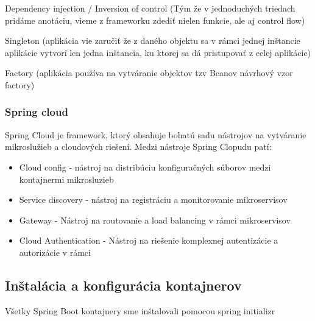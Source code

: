   

Dependency injection / Inversion of control (Tým že v jednoduchých triedach pridáme anotáciu, vieme z frameworku zdediť nielen funkcie, ale aj control flow)  

  

Singleton (aplikácia vie zaručiť že z daného objektu sa v rámci jednej inštancie aplikácie vytvorí len jedna inštancia, ku ktorej sa dá pristupovať z celej aplikácie) 

  

Factory (aplikácia používa na vytváranie objektov tzv Beanov návrhový vzor factory) 

  

  

  

\subsubsection{Spring cloud} 

 Spring Cloud je framework, ktorý obsahuje bohatú sadu nástrojov na vytváranie mikroslužieb a cloudových riešení. Medzi nástroje Spring Clopudu patí:  

\begin{itemize} 

\item Cloud config - nástroj na distribúciu konfiguračných súborov medzi kontajnermi mikrosluzieb 

\item Service discovery - nástroj na registráciu a monitorovanie mikroservisov 

\item Gateway - Nástroj na routovanie a load balancing v rámci mikroservisov 

\item Cloud Authentication - Nástroj na riešenie komplexnej autentizácie a autorizácie v rámci 

\end{itemize} 

  

  

  

\subsection{Inštalácia a konfigurácia kontajnerov} 

 Všetky Spring Boot kontajnery sme inštalovali pomocou spring initializr 


